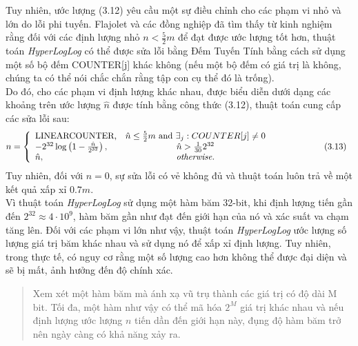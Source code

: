\documentclass[a4paper,13pt]{article}
\theoremstyle{mytheor}
\begin{document}
\indent Tuy nhiên, ước lượng (3.12) yêu cầu một sự điều chỉnh cho các phạm vi nhỏ và lớn do lỗi phi tuyến. Flajolet và các đồng nghiệp 
đã tìm thấy từ kinh nghiệm rằng đối với các định lượng nhỏ $n < \frac{5}{2}m$ để đạt được ước lượng tốt hơn, thuật toán \textit{HyperLogLog} 
có thể được sửa lỗi bằng Đếm Tuyến Tính bằng cách sử dụng một số bộ đếm COUNTER[j] khác không (nếu một bộ đếm có giá trị là không, 
chúng ta có thể nói chắc chắn rằng tập con cụ thể đó là trống).\\
Do đó, cho các phạm vi định lượng khác nhau, được biểu diễn dưới dạng các khoảng trên ước lượng $\hat{n}$ được tính bằng công thức (3.12), 
thuật toán cung cấp các sửa lỗi sau:
\[
    n = \left\{ \begin{array}{lcl}
        \text{LINEARCOUNTER,} & \hat{n} \leq \frac{5}{2}m \mbox{ and } \exists_j : COUNTER[j] \neq 0 \\ 
        -2^{32}\log\left(1-\frac{\hat{n}}{2^{32}}\right), & \hat{n}>\frac{1}{30}2^{32} & \mbox{\hspace{2cm}(3.13)} \\
        \hat{n}, & \textit{otherwise.}
        \end{array}\right.    
\]
\indent Tuy nhiên, đối với $n = 0$, sự sửa lỗi có vẻ không đủ và thuật toán luôn trả về một kết quả xấp xỉ $0.7m$.\\
Vì thuật toán \textit{HyperLogLog} sử dụng một hàm băm 32-bit, khi định lượng tiến gần đến $2^{32}\approx 4 \cdot 10^9$, 
hàm băm gần như đạt đến giới hạn của nó và xác suất va chạm tăng lên. Đối với các phạm vi lớn như vậy, thuật toán \textit{HyperLogLog} 
ước lượng số lượng giá trị băm khác nhau và sử dụng nó để xấp xỉ định lượng. Tuy nhiên, trong thực tế, có nguy cơ rằng một số lượng cao hơn 
không thể được đại diện và sẽ bị mất, ảnh hưởng đến độ chính xác.\\
\vspace{0.25cm}
\begin{quote}
    Xem xét một hàm băm mà ánh xạ vũ trụ thành các giá trị có độ dài M bit. Tối đa, một hàm như vậy có thể mã hóa $2^M$ 
    giá trị khác nhau và nếu định lượng ước lượng $n$ tiến dần đến giới hạn này, đụng độ hàm băm trở nên ngày càng có khả năng xảy ra.
    \vspace{0.25cm}
\end{quote}
\end{document}
